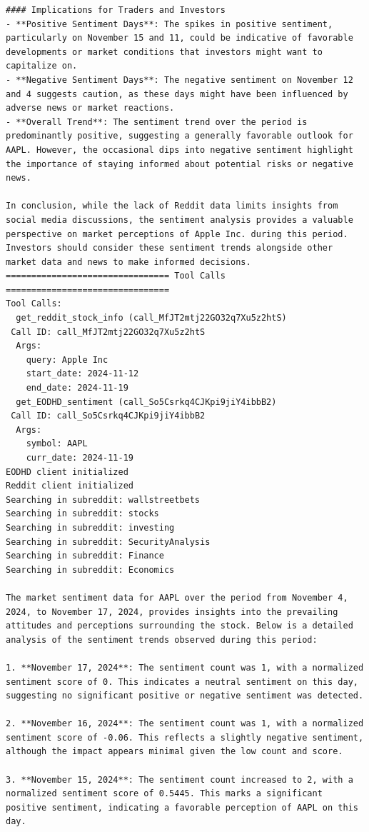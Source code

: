 \begin{tcolorbox}
\begin{lstlisting}[style=agentbase]
#### Implications for Traders and Investors
- **Positive Sentiment Days**: The spikes in positive sentiment, particularly on November 15 and 11, could be indicative of favorable developments or market conditions that investors might want to capitalize on.
- **Negative Sentiment Days**: The negative sentiment on November 12 and 4 suggests caution, as these days might have been influenced by adverse news or market reactions.
- **Overall Trend**: The sentiment trend over the period is predominantly positive, suggesting a generally favorable outlook for AAPL. However, the occasional dips into negative sentiment highlight the importance of staying informed about potential risks or negative news.

In conclusion, while the lack of Reddit data limits insights from social media discussions, the sentiment analysis provides a valuable perspective on market perceptions of Apple Inc. during this period. Investors should consider these sentiment trends alongside other market data and news to make informed decisions.
================================ Tool Calls ================================
Tool Calls:
  get_reddit_stock_info (call_MfJT2mtj22GO32q7Xu5z2htS)
 Call ID: call_MfJT2mtj22GO32q7Xu5z2htS
  Args:
    query: Apple Inc
    start_date: 2024-11-12
    end_date: 2024-11-19
  get_EODHD_sentiment (call_So5Csrkq4CJKpi9jiY4ibbB2)
 Call ID: call_So5Csrkq4CJKpi9jiY4ibbB2
  Args:
    symbol: AAPL
    curr_date: 2024-11-19
EODHD client initialized
Reddit client initialized
Searching in subreddit: wallstreetbets
Searching in subreddit: stocks
Searching in subreddit: investing
Searching in subreddit: SecurityAnalysis
Searching in subreddit: Finance
Searching in subreddit: Economics

The market sentiment data for AAPL over the period from November 4, 2024, to November 17, 2024, provides insights into the prevailing attitudes and perceptions surrounding the stock. Below is a detailed analysis of the sentiment trends observed during this period:

1. **November 17, 2024**: The sentiment count was 1, with a normalized sentiment score of 0. This indicates a neutral sentiment on this day, suggesting no significant positive or negative sentiment was detected.

2. **November 16, 2024**: The sentiment count was 1, with a normalized sentiment score of -0.06. This reflects a slightly negative sentiment, although the impact appears minimal given the low count and score.

3. **November 15, 2024**: The sentiment count increased to 2, with a normalized sentiment score of 0.5445. This marks a significant positive sentiment, indicating a favorable perception of AAPL on this day.


\end{lstlisting}
\end{tcolorbox}
